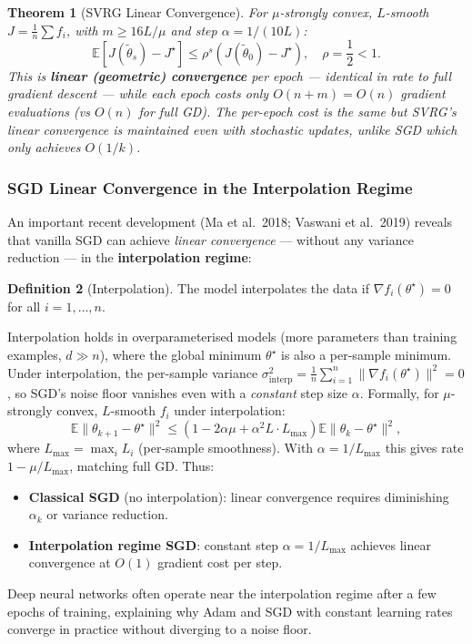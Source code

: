 \documentclass[11pt,a4paper]{article}
\newtheorem{theorem}{Theorem}[section]
\theoremstyle{definition}
\newtheorem{definition}[theorem]{Definition}
\begin{document}
\begin{theorem}[SVRG Linear Convergence]
For $\mu$-strongly convex, $L$-smooth $J = \frac{1}{n}\sum f_i$, with $m \geq 16L/\mu$ and step $\alpha = 1/(10L)$:
\begin{equation}
\mathbb{E}[J(\tilde{\theta}_s) - J^{\star}] \leq \rho^s (J(\tilde{\theta}_0) - J^{\star}), \quad \rho = \frac{1}{2} < 1.
\end{equation}
This is \textbf{linear (geometric) convergence} per epoch --- identical in rate to full gradient descent --- while each epoch costs only $O(n + m) = O(n)$ gradient evaluations (vs $O(n)$ for full GD). The per-epoch cost is the same but SVRG's linear convergence is maintained even with stochastic updates, unlike SGD which only achieves $O(1/k)$.
\end{theorem}

\subsubsection{SGD Linear Convergence in the Interpolation Regime}

An important recent development (Ma et al.\ 2018; Vaswani et al.\ 2019) reveals that vanilla SGD can achieve \emph{linear convergence} --- without any variance reduction --- in the \textbf{interpolation regime}:
\begin{definition}[Interpolation]
The model interpolates the data if $\nabla f_i(\theta^{\star}) = 0$ for all $i = 1, \ldots, n$.
\end{definition}
Interpolation holds in overparameterised models (more parameters than training examples, $d \gg n$), where the global minimum $\theta^{\star}$ is also a per-sample minimum. Under interpolation, the per-sample variance $\sigma^2_{\text{interp}} = \frac{1}{n}\sum_{i=1}^n \|\nabla f_i(\theta^{\star})\|^2 = 0$, so SGD's noise floor vanishes even with a \emph{constant} step size $\alpha$. Formally, for $\mu$-strongly convex, $L$-smooth $f_i$ under interpolation:
\begin{equation}
\mathbb{E}\|\theta_{k+1} - \theta^{\star}\|^2 \leq \left(1 - 2\alpha\mu + \alpha^2 L \cdot L_{\max}\right)\mathbb{E}\|\theta_k - \theta^{\star}\|^2,
\end{equation}
where $L_{\max} = \max_i L_i$ (per-sample smoothness). With $\alpha = 1/L_{\max}$ this gives rate $1 - \mu/L_{\max}$, matching full GD. Thus:
\begin{itemize}
\item \textbf{Classical SGD} (no interpolation): linear convergence requires diminishing $\alpha_k$ or variance reduction.
\item \textbf{Interpolation regime SGD}: constant step $\alpha = 1/L_{\max}$ achieves linear convergence at $O(1)$ gradient cost per step.
\end{itemize}
Deep neural networks often operate near the interpolation regime after a few epochs of training, explaining why Adam and SGD with constant learning rates converge in practice without diverging to a noise floor.
\end{document}
